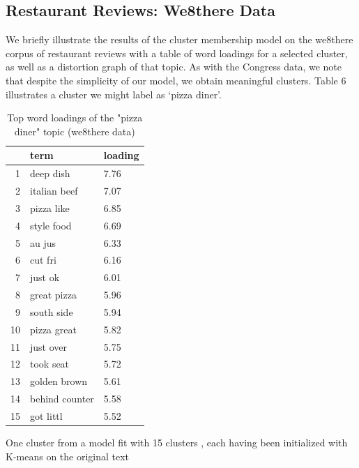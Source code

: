\documentclass[12pt]{article}
\begin{document}
\subsection{Restaurant Reviews: We8there Data}

We briefly illustrate the results of the cluster membership model on the we8there corpus of restaurant reviews with a table of word loadings for a selected cluster, as well as a distortion graph of that topic. 
As with the Congress data, we note that despite the simplicity of our model, we obtain meaningful clusters. Table 6 illustrates a cluster we might label as `pizza diner'. 


\begin{table}[ht]
\centering
\begin{threeparttable}
\caption{Top word loadings of the "pizza diner" topic (we8there data)}
\begin{tabular}{rll}
  \hline
 & term & loading \\ 
  \hline
1 & deep dish & 7.76 \\ 
  2 & italian beef & 7.07 \\ 
  3 & pizza like & 6.85 \\ 
  4 & style food & 6.69 \\ 
  5 & au jus & 6.33 \\ 
  6 & cut fri & 6.16 \\ 
  7 & just ok & 6.01 \\ 
  8 & great pizza & 5.96 \\ 
  9 & south side & 5.94 \\ 
  10 & pizza great & 5.82 \\ 
  11 & just over & 5.75 \\ 
  12 & took seat & 5.72 \\ 
  13 & golden brown & 5.61 \\ 
  14 & behind counter & 5.58 \\ 
  15 & got littl & 5.52 \\ 
   \hline
\end{tabular}
\begin{tablenotes}
\small
\item One cluster from a model fit with 15 clusters , each having been initialized with K-means on the original text
\end{tablenotes}
\end{threeparttable}
\end{table}
\end{document}
